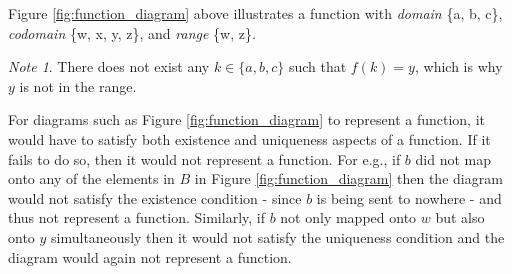 \documentclass{amsart}
\theoremstyle{definition}
\theoremstyle{definition}
\theoremstyle{remark}
\newtheorem*{note}{Note}
\begin{document}
Figure \ref{fig:function_diagram} above illustrates a function with \emph{domain} \{a, b, c\}, \emph{codomain} \{w, x, y, z\}, and \emph{range} \{w, z\}.
\begin{note}
      There does not exist any $k \in \{a, b, c\}$ such that $f(k)=y$, which is why $y$ is not in the range.
\end{note}

For diagrams such as Figure \ref{fig:function_diagram} to represent a function, it would have to satisfy both existence and uniqueness aspects of a function. If it fails to do so, then it would not represent a function. For e.g., if $b$ did not map onto any of the elements in $B$ in Figure \ref{fig:function_diagram} then the diagram would not satisfy the existence condition - since $b$ is being sent to nowhere - and thus not represent a function. Similarly, if $b$ not only mapped onto $w$ but also onto $y$ simultaneously then it would not satisfy the uniqueness condition and the diagram would again not represent a function.
\end{document}
